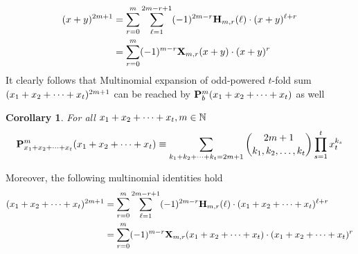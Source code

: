 \documentclass[12pt,letterpaper,oneside,reqno]{amsart}
\newcommand \multifoldSum [2][x]{{#1}\sb{1} + {#1}\sb{2} + \cdots + {#1}\sb{#2}}
\newcommand \coeffH [4][H] {{\mathbf{#1}} \sb{#2,#3} (#4)}
\newcommand \polynomialX [4][X] {{\mathbf{#1}}\sb{#2,#3} (#4)}
\newcommand \polynomialP [4][P]{{\mathbf{#1}}\sp{#2} \sb{#3}(#4)}
\newtheorem{cor}[thm]{Corollary}
\numberwithin{equation}{section}
\begin{document}
    \begin{equation*}
        \begin{split}
            (x+y)^{2m+1}
            &=\sum_{r=0}^{m} \sum_{\ell=1}^{2m-r+1} (-1)^{2m-r} \coeffH{m}{r}{\ell} \cdot (x+y)^{\ell+r} \\
            &=\sum_{r=0}^{m} (-1)^{m-r} \polynomialX{m}{r}{x+y} \cdot (x+y)^r
        \end{split}
    \end{equation*}
    It clearly follows that Multinomial expansion of odd-powered $t$-fold sum $(\multifoldSum{t})^{2m+1}$ can be
    reached by $\polynomialP{m}{b}{\multifoldSum{t}}$ as well
    \begin{cor}
        For all $\multifoldSum{t},m \in \mathbb{N}$
        \begin{equation*}
            \polynomialP{m}{\multifoldSum{t}}{\multifoldSum{t}}
            \equiv
            \sum_{\multifoldSum[k]{t}=2m+1} \binom{2m+1}{k_1, k_2,\ldots, k_t} \prod_{s=1}^{t} x_t^{k_s}
        \end{equation*}
    \end{cor}
    Moreover, the following multinomial identities hold
    \begin{equation*}
        \begin{split}
            (\multifoldSum{t})^{2m+1}
            &=\sum_{r=0}^{m} \sum_{\ell=1}^{2m-r+1} (-1)^{2m-r} \coeffH{m}{r}{\ell} \cdot (\multifoldSum{t})^{\ell+r} \\
            &=\sum_{r=0}^{m} (-1)^{m-r} \polynomialX{m}{r}{\multifoldSum{t}} \cdot (\multifoldSum{t})^r
        \end{split}
    \end{equation*}
\end{document}
